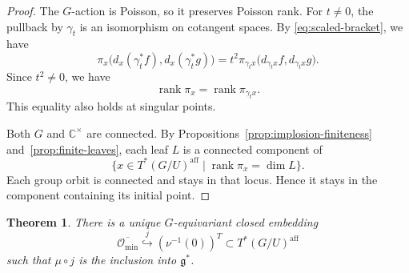 \documentclass[12pt]{article}
\theoremstyle{paperplain}
\newtheorem{theorem}{Theorem}[section]
\theoremstyle{paperdefinition}
\newcommand{\C}{\mathbb C}
\newcommand{\Omin}{\mathcal O_{\min}}
\newcommand{\g}{\mathfrak g}
\begin{document}
\begin{proof}
    The $G$-action is Poisson, so it preserves Poisson rank. For $t\ne0$, the pullback by $\gamma_t$ is an isomorphism on cotangent spaces. By \eqref{eq:scaled-bracket}, we have
    $$
        \pi_x\bigl(d_x(\gamma_t^*f),d_x(\gamma_t^*g)\bigr)
        =t^2\pi_{\gamma_t x}\bigl(d_{\gamma_t x}f,d_{\gamma_t x}g\bigr).
    $$
    Since $t^2\ne0$, we have
    $$
        \operatorname{rank}\pi_x=\operatorname{rank}\pi_{\gamma_t x}.
    $$
    This equality also holds at singular points.

    Both $G$ and $\C^\times$ are connected. By Propositions~\ref{prop:implosion-finiteness} and~\ref{prop:finite-leaves}, each leaf $L$ is a connected component of
    $$
        \{x\in T^*(G/U)^{\mathrm{aff}}\mid\operatorname{rank}\pi_x=\dim L\}.
    $$
    Each group orbit is connected and stays in that locus. Hence it stays in the component containing its initial point.
\end{proof}

\newpage
\setlength{\abovedisplayskip}{12pt plus 2pt minus 2pt}
\setlength{\belowdisplayskip}{12pt plus 2pt minus 2pt}
\setlength{\abovedisplayshortskip}{0pt plus 2pt}
\setlength{\belowdisplayshortskip}{10pt plus 2pt minus 2pt}
\begin{theorem}\label{thm:lift}
    There is a unique $G$-equivariant closed embedding
    $$
        \overline{\Omin}\overset{j}{\hookrightarrow}
        (\nu^{-1}(0))^T\subset T^*(G/U)^{\mathrm{aff}}
    $$
    such that $\mu\circ j$ is the inclusion into $\g^*$.
\end{theorem}
\end{document}
